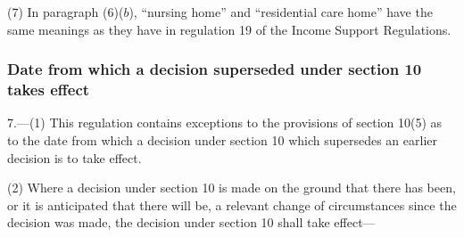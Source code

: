 \documentclass[12pt,a4paper]{article}
\begin{document}
(7) In paragraph (6)($b$), “nursing home” and “residential care home” have the same meanings as they have in regulation 19 of the Income Support Regulations.

\subsubsection[7. Date from which a decision superseded under section 10 takes effect]{Date from which a decision superseded under section 10 takes effect}

7.—(1) This regulation contains exceptions to the provisions of section 10(5) as to the date from which a decision under section 10 which supersedes an earlier decision is to take effect.

(2) Where a decision under section 10 is made on the ground that there has been, or it is anticipated that there will be, a relevant change of circumstances since the decision was made, the decision under section 10 shall take effect—
\end{document}
